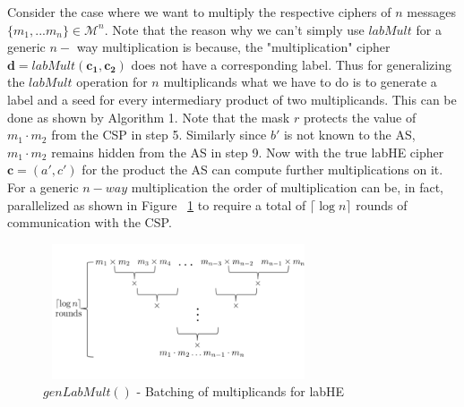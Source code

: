 Consider the case where we want to multiply the respective ciphers of  $n$ messages $\{m_1,...m_n\} \in \mathcal{M}^n$. Note that the reason why we can't simply use $labMult$ for a generic $n-$ way multiplication is because, the "multiplication" cipher $\mathbf{d}=labMult(\mathbf{c_1},\mathbf{c_2})$ does not have  a corresponding label. Thus for generalizing the $labMult$ operation for $n$ multiplicands what we have to do is to generate a label and a seed for every intermediary product of two multiplicands. This can be done as shown by Algorithm 1. Note that the mask $r$ protects the value of $m_1\cdot m_2$ from the \textsf{CSP} in step 5. Similarly since $b'$ is not known to the \textsf{AS}, $m_1\cdot m_2$ remains hidden from the \textsf{AS} in step 9. Now with the true \textsf{labHE} cipher $\mathbf{c}=(a',c')$ for the product the \textsf{AS} can compute further multiplications on it.
For a generic $n-way$ multiplication the order of multiplication can be, in fact, parallelized as  shown in Figure ~\ref{genlab-fig} to require a total of $\lceil \log n\rceil$ rounds of communication with the \textsf{CSP}.
\begin{figure}\includegraphics[height=4cm,width=8cm]{kk.png} \caption{ $genLabMult()$ - Batching of multiplicands for \textsf{labHE}} \label{genlab-fig}\end{figure}\\
